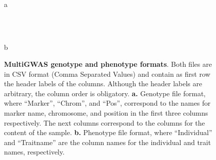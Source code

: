 \begin{figure}[H]
\begin{centering}
\begin{minipage}[t]{0.6\columnwidth}%
\begin{center}
\\
a
\par\end{center}%
\end{minipage}~~~~~~~~~%
\begin{minipage}[t]{0.3\columnwidth}%
\begin{center}
\\
b
\par\end{center}%
\end{minipage}
\par\end{centering}
\begin{centering}
\par\end{centering}
\caption{\textbf{MultiGWAS genotype and phenotype formats}. Both files are in CSV format (Comma Separated Values) and contain as first row the header labels of the columns. Although the header labels are arbitrary, the column order is obligatory. \textbf{a.} Genotype file format, where ``Marker'', ``Chrom'', and ``Pos'', correspond to the names for marker name, chromosome, and position in the first three columns respectively. The next columns correspond to the columns for the content of the sample. \textbf{b.} Phenotype file format, where ``Individual'' and ``Traitname'' are the column names for the individual and trait names, respectively.\label{fig:File-Formats}}
\end{figure}

